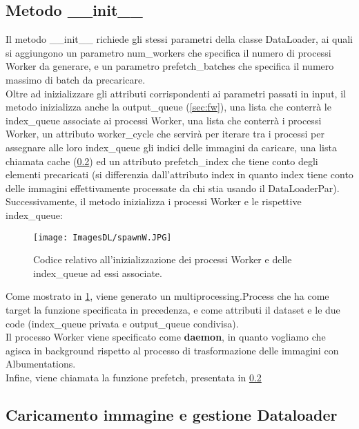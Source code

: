\documentclass[10pt,twocolumn,letterpaper]{article}
\begin{document}
\subsection{Metodo \_\_init\_\_}

Il metodo \_\_init\_\_ richiede gli stessi parametri della classe DataLoader, ai quali si aggiungono un parametro num\_workers che specifica il numero di processi Worker da generare, e un parametro prefetch\_batches che specifica il numero massimo di batch da precaricare.\\
Oltre ad inizializzare gli attributi corrispondenti ai parametri passati in input, il metodo inizializza anche la output\_queue (\cref{sec:fw}), una lista che conterrà le index\_queue associate ai processi Worker, una lista che conterrà i processi Worker, un attributo worker\_cycle che servirà per iterare tra i processi per assegnare alle loro index\_queue gli indici delle immagini da caricare, una lista chiamata cache (\cref{sec:load}) ed un attributo prefetch\_index che tiene conto degli elementi precaricati (si differenzia dall'attributo index in quanto index tiene conto delle immagini effettivamente processate da chi stia usando il DataLoaderPar).\\
Successivamente, il metodo inizializza i processi Worker e le rispettive index\_queue:

\begin{figure}[h]
    \centering
    \texttt{[image: ImagesDL/spawnW.JPG]}
    \caption{Codice relativo all'inizializzazione dei processi Worker e delle index\_queue ad essi associate.}
    \label{fig:spW}
\end{figure}

Come mostrato in \cref{fig:spW}, viene generato un multiprocessing.Process che ha come target la funzione specificata in precedenza, e come attributi il dataset e le due code (index\_queue privata e output\_queue condivisa).\\
Il processo Worker viene specificato come \textbf{daemon}, in quanto vogliamo che agisca in background rispetto al processo di trasformazione delle immagini con Albumentations.\\
Infine, viene chiamata la funzione prefetch, presentata in \cref{sec:load}

\subsection{Caricamento immagine e gestione Dataloader}
\label{sec:load}
\end{document}
